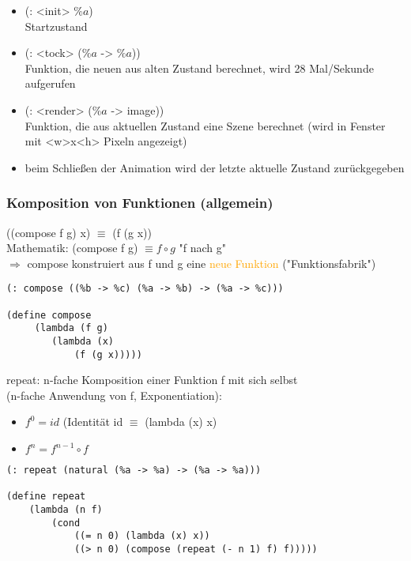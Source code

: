 \documentclass[paper=a4, fontsize=11pt]{scrartcl}
\numberwithin{equation}{section}
\numberwithin{figure}{section}
\numberwithin{table}{section}
\begin{document}
\begin{lstlistig}
\begin{itemize}
\item (: <init> $\%a$) \\
         Startzustand
\item (: <tock> ($\%a$ -> $\%a$)) \\
         Funktion, die neuen aus alten Zustand berechnet, wird 28 Mal/Sekunde aufgerufen
\item (: <render> ($\%a$ -> image)) \\
         Funktion, die aus aktuellen Zustand eine Szene berechnet (wird in Fenster mit <w>x<h> Pixeln angezeigt)
\item beim Schließen der Animation wird der letzte aktuelle Zustand zurückgegeben
\end{itemize}
\subsubsection{Komposition von Funktionen (allgemein)}

((compose f g) x) $\equiv$ (f (g x)) \\
Mathematik: (compose f g) $\equiv f \circ g$ "f nach g" \\
$\Rightarrow$ compose konstruiert aus f und g eine \textcolor{orange}{neue Funktion} ("Funktionsfabrik") \\

\begin{lstlisting}
(: compose ((%b -> %c) (%a -> %b) -> (%a -> %c)))

(define compose
     (lambda (f g)
        (lambda (x)
            (f (g x)))))
\end{lstlisting}

repeat: n-fache Komposition einer Funktion f mit sich selbst \\
(n-fache Anwendung von f, Exponentiation): \\
\begin{itemize}
\item $f^{0} = id$ (Identität id $\equiv$ (lambda (x) x)
\item $f^{n} = f^{n-1} \circ f$
\end{itemize}

\begin{lstlisting}
(: repeat (natural (%a -> %a) -> (%a -> %a)))

(define repeat
    (lambda (n f)
        (cond
            ((= n 0) (lambda (x) x))
            ((> n 0) (compose (repeat (- n 1) f) f)))))
            

\end{lstlisting}
\end{lstlistig}
\end{document}
